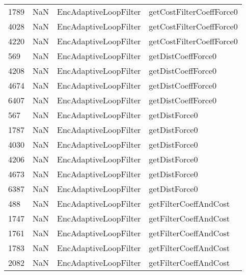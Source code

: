 \begin{tabular}{llll}
1789 &                   NaN &      EncAdaptiveLoopFilter &                  getCostFilterCoeffForce0 \\
4028 &                   NaN &      EncAdaptiveLoopFilter &                  getCostFilterCoeffForce0 \\
4220 &                   NaN &      EncAdaptiveLoopFilter &                  getCostFilterCoeffForce0 \\
569  &                   NaN &      EncAdaptiveLoopFilter &                        getDistCoeffForce0 \\
4208 &                   NaN &      EncAdaptiveLoopFilter &                        getDistCoeffForce0 \\
4674 &                   NaN &      EncAdaptiveLoopFilter &                        getDistCoeffForce0 \\
6407 &                   NaN &      EncAdaptiveLoopFilter &                        getDistCoeffForce0 \\
567  &                   NaN &      EncAdaptiveLoopFilter &                             getDistForce0 \\
1787 &                   NaN &      EncAdaptiveLoopFilter &                             getDistForce0 \\
4030 &                   NaN &      EncAdaptiveLoopFilter &                             getDistForce0 \\
4206 &                   NaN &      EncAdaptiveLoopFilter &                             getDistForce0 \\
4673 &                   NaN &      EncAdaptiveLoopFilter &                             getDistForce0 \\
6387 &                   NaN &      EncAdaptiveLoopFilter &                             getDistForce0 \\
488  &                   NaN &      EncAdaptiveLoopFilter &                     getFilterCoeffAndCost \\
1747 &                   NaN &      EncAdaptiveLoopFilter &                     getFilterCoeffAndCost \\
1761 &                   NaN &      EncAdaptiveLoopFilter &                     getFilterCoeffAndCost \\
1783 &                   NaN &      EncAdaptiveLoopFilter &                     getFilterCoeffAndCost \\
2082 &                   NaN &      EncAdaptiveLoopFilter &                     getFilterCoeffAndCost \\

\end{tabular}
